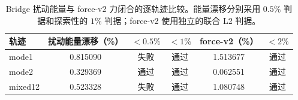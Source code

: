 \begin{table}[htbp]
\centering
\caption{Bridge 扰动能量与 force-v2 力闭合的逐轨迹比较。能量漂移分别采用 \(0.5\%\) 判据和探索性的 \(1\%\) 判据；force-v2 使用独立的联合 L2 判据。}
\label{tab:bridge-gate-summary}
\scriptsize
\setlength{\tabcolsep}{4pt}
\begin{tabular}{@{}lccccc@{}}
\toprule
轨迹 & 扰动能量漂移（\%） & \(<0.5\%\) & \(<1\%\) & force-v2（\%） & \(<2\%\) \\
\midrule
mode1  & 0.815090 & 失败 & 通过 & 1.513677 & 通过 \\
mode2  & 0.329369 & 通过 & 通过 & 0.062551 & 通过 \\
mixed12 & 0.523328 & 失败 & 通过 & 1.080748 & 通过 \\
\bottomrule
\end{tabular}
\end{table}
